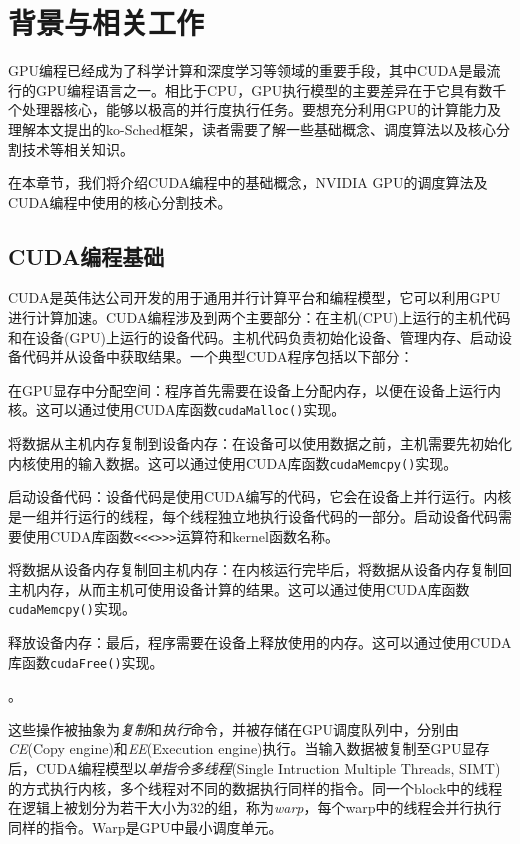 \chapter{背景与相关工作}\label{background}

GPU编程已经成为了科学计算和深度学习等领域的重要手段，其中CUDA是最流行的GPU编程语言之一。相比于CPU，GPU执行模型的主要差异在于它具有数千个处理器核心，能够以极高的并行度执行任务。要想充分利用GPU的计算能力及理解本文提出的ko-Sched框架，读者需要了解一些基础概念、调度算法以及核心分割技术等相关知识。

在本章节，我们将介绍CUDA编程中的基础概念，NVIDIA GPU的调度算法及CUDA编程中使用的核心分割技术。

\section{CUDA编程基础}

CUDA是英伟达公司开发的用于通用并行计算平台和编程模型，它可以利用GPU进行计算加速。CUDA编程涉及到两个主要部分：在主机(CPU)上运行的主机代码和在设备(GPU)上运行的设备代码。主机代码负责初始化设备、管理内存、启动设备代码并从设备中获取结果。一个典型CUDA程序包括以下部分：
\begin{enumerate*}[label=\roman*),itemjoin={\quad}]
    \item 在GPU显存中分配空间：程序首先需要在设备上分配内存，以便在设备上运行内核。这可以通过使用CUDA库函数\texttt{cudaMalloc()}实现。
    \item 将数据从主机内存复制到设备内存：在设备可以使用数据之前，主机需要先初始化内核使用的输入数据。这可以通过使用CUDA库函数\texttt{cudaMemcpy()}实现。
    \item 启动设备代码：设备代码是使用CUDA编写的代码，它会在设备上并行运行。内核是一组并行运行的线程，每个线程独立地执行设备代码的一部分。启动设备代码需要使用CUDA库函数\texttt{<<<>>>}运算符和kernel函数名称。
    \item 将数据从设备内存复制回主机内存：在内核运行完毕后，将数据从设备内存复制回主机内存，从而主机可使用设备计算的结果。这可以通过使用CUDA库函数\texttt{cudaMemcpy()}实现。
    \item 释放设备内存：最后，程序需要在设备上释放使用的内存。这可以通过使用CUDA库函数\texttt{cudaFree()}实现。
\end{enumerate*}。

这些操作被抽象为\emph{复制}和\emph{执行}命令，并被存储在GPU调度队列中，分别由\emph{CE}(Copy engine)和\emph{EE}(Execution engine)执行。当输入数据被复制至GPU显存后，CUDA编程模型以\emph{单指令多线程}(Single Intruction Multiple Threads, SIMT)的方式执行内核，多个线程对不同的数据执行同样的指令。同一个block中的线程在逻辑上被划分为若干大小为32的组，称为\emph{warp}，每个warp中的线程会并行执行同样的指令。Warp是GPU中最小调度单元。


